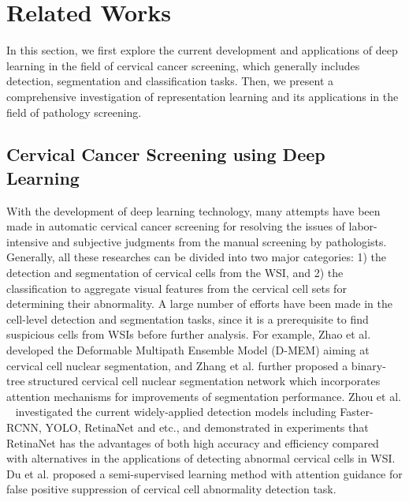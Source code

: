 

\section{Related Works}\label{sec:related}
In this section, we first explore the current development and applications of deep learning in the field of cervical cancer screening, which generally includes detection, segmentation and classification tasks. Then, we present a comprehensive investigation of representation learning and its applications in the field of pathology screening. 

\subsection{Cervical Cancer Screening using Deep Learning}
With the development of deep learning technology, many attempts have been made in automatic cervical cancer screening for resolving the issues of labor-intensive and subjective judgments from the manual screening by pathologists. Generally, all these researches can be divided into two major categories: 1) the detection and segmentation of cervical cells from the WSI, and 2) the classification to aggregate visual features from the cervical cell sets for determining their abnormality. A large number of efforts have been made in the cell-level detection and segmentation tasks, since it is a prerequisite to find suspicious cells from WSIs before further analysis. For example, Zhao et al.\cite{zhao2019automated} developed the Deformable Multipath Ensemble Model (D-MEM) aiming at cervical cell nuclear segmentation, and Zhang et al.\cite{zhang2019binary} further proposed a binary-tree structured cervical cell nuclear segmentation network which incorporates attention mechanisms for improvements of segmentation performance. Zhou et al. ~\cite{zhou2021hierarchical} investigated the current widely-applied detection models including Faster-RCNN\cite{ren2015faster}, YOLO\cite{redmon2018yolov3}, RetinaNet\cite{lin2017focal} and etc., and demonstrated in experiments that RetinaNet has the advantages of both high accuracy and efficiency compared with alternatives in the applications of detecting abnormal cervical cells in WSI. Du et al. \cite{du2021false} proposed a semi-supervised learning method with attention guidance for false positive suppression of cervical cell abnormality detection task.  

